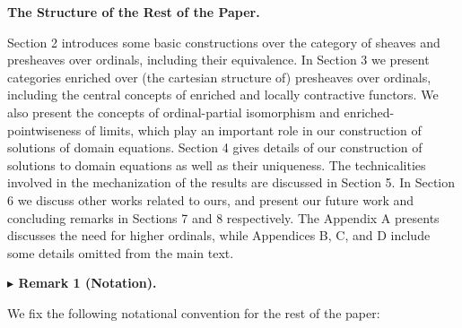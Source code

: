  
 
 
\par\medskip\noindent\textbf{The Structure of the Rest of the Paper.}\par
 
 
Section 2 introduces some basic constructions over the category of sheaves and presheaves over ordinals, including their equivalence. In Section 3 we present categories enriched over (the cartesian structure of) presheaves over ordinals, including the central concepts of enriched and locally contractive functors. We also present the concepts of ordinal-partial isomorphism and enriched-pointwiseness of limits, which play an important role in our construction of solutions of domain equations. Section 4 gives details of our construction of solutions to domain equations as well as their uniqueness. The technicalities involved in the mechanization of the results are discussed in Section 5. In Section 6 we discuss other works related to ours, and present our future work and concluding remarks in Sections 7 and 8 respectively. The Appendix A presents discusses the need for higher ordinals, while Appendices B, C, and D include some details omitted from the main text.\par
 
 
 
\par\medskip\noindent\textbf{$\blacktriangleright$ Remark 1 (Notation).}\par
 
 
We fix the following notational convention for the rest of the paper:\par
 
